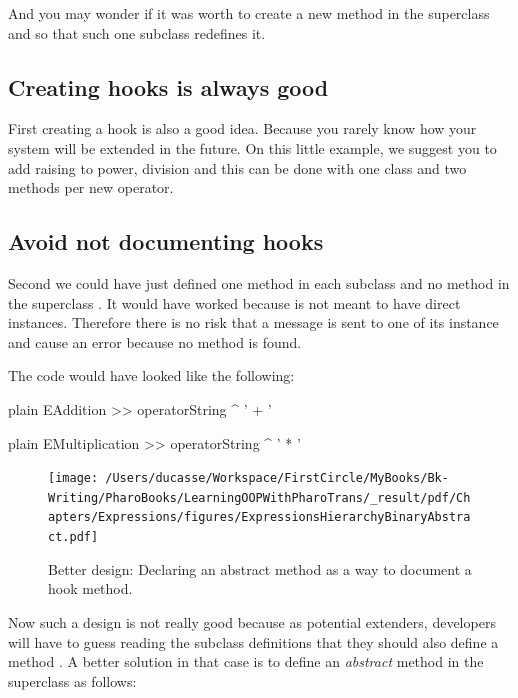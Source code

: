 \documentclass[10pt,twoside,english]{_support/latex/sbabook/sbabook}
\begin{document}
And you may wonder if it was worth to create a new method in the superclass and so that such one subclass redefines it. 
\subsection{Creating hooks is always good}
First creating a hook is also a good idea. Because you rarely know how your system will be extended in the future. On this little example, we suggest you to add raising to power, division and this can be done with one class and two methods per new operator. 
\subsection{Avoid not documenting hooks}
Second we could have just defined one method  in each subclass and no method in the superclass . It would have worked because  is not meant to have direct instances. Therefore there is no risk that a  message is sent to one of its instance and cause an error because no method  is found. 

The code would have looked like the following: 

\begin{displaycode}{plain}
EAddition >> operatorString
	^ ' + '
\end{displaycode}

\begin{displaycode}{plain}
EMultiplication >> operatorString
	^ ' * '
\end{displaycode}


\begin{figure}

\begin{center}
\texttt{[image: /Users/ducasse/Workspace/FirstCircle/MyBooks/Bk-Writing/PharoBooks/LearningOOPWithPharoTrans/\_result/pdf/Chapters/Expressions/figures/ExpressionsHierarchyBinaryAbstract.pdf]}\caption{Better design: Declaring an abstract method as a way to document a hook method.\label{figExpressionsHierarchyBinaryAbstract}}\end{center}
\end{figure}


Now such a design is not really good because as potential extenders, developers will have to guess reading the subclass definitions that they should also define a method . A better solution in that case is to define an \textit{abstract} method in the superclass as follows: 
\end{document}
